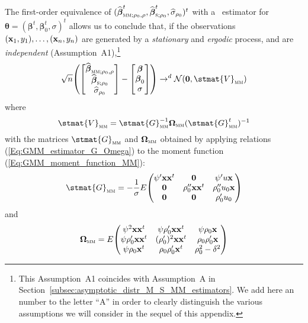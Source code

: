 The first-order equivalence of
$(\sthat{\boldsymbol\beta}_{\stsc{MM};\rho_0,\rho}^t,
\sthat{\boldsymbol\beta}_{\stsc{S};\rho_0}^t, \sthat{\sigma}_{\rho_0})^t$ with
a ~estimator for $\boldsymbol\theta = (\boldsymbol\beta^t,
\boldsymbol\beta_0^t, \sigma)^t$ allows us to conclude that, if the
observations $(\mathbf x_1, y_1), \dots, (\mathbf x_n, y_n)$ are generated by a
\emph{stationary} and \emph{ergodic} process, and are \emph{independent}
(Assumption~A1),\footnote{This Assumption~A1 coincides with Assumption~A in
Section~\ref{subsec:asymptotic_distr_M_S_MM_estimators}. We add here an number
to the letter “A” in order to clearly distinguish the various assumptions we
will consider in the sequel of this appendix.}
\[
    \sqrt{n}\left(
    \begin{bmatrix}
        \sthat{\boldsymbol\beta}_{\stsc{MM};\rho_0,\rho}\\
        \sthat{\boldsymbol\beta}_{\stsc{S};\rho_0}\\
        \sthat{\sigma}_{\rho_0}
    \end{bmatrix}
    -
    \begin{bmatrix}
        \boldsymbol\beta\\
        \boldsymbol\beta_0\\
        \sigma
    \end{bmatrix}
    \right)  \rightarrow^{d} \mathcal{N}(\stvec{0}, \stmat{V}_\stsc{MM})
\]
where
\[
    \stmat{V}_\stsc{MM} = \stmat{G}_\stsc{MM}^{-1} \boldsymbol\Omega_\stsc{MM}
        (\stmat{G}_\stsc{MM}^t)^{-1}
\]
with the matrices $\stmat{G}_\stsc{MM}$ and $\boldsymbol\Omega_\stsc{MM}$
obtained by applying relations (\ref{Eq:GMM_estimator_G_Omega}) to the moment
function (\ref{Eq:GMM_moment_function_MM}):
\[
    \stmat{G}_\stsc{MM} = -\frac{1}{\sigma} E
    \begin{pmatrix}
        \psi'\stvec{x}\stvec{x}^t & \stvec{0}                    & \psi'u\stvec{x}      \\
        \stvec{0}                 & \rho_0''\stvec{x}\stvec{x}^t & \rho_0''u_0\stvec{x} \\
        \stvec{0}                 & \stvec{0}                    & \rho_0'u_0  
    \end{pmatrix}
\]
and
\[
    \boldsymbol\Omega_\stsc{MM} = E
    \begin{pmatrix}
        \psi^2\stvec{x}\stvec{x}^t      & \psi\rho_0'\stvec{x}\stvec{x}^t & \psi\rho_0\stvec{x}   \\
        \psi\rho_0'\stvec{x}\stvec{x}^t & (\rho_0')^2\stvec{x}\stvec{x}^t & \rho_0\rho_0'\stvec{x}\\
        \psi\rho_0\stvec{x}^t           & \rho_0\rho_0'\stvec{x}^t        & \rho_0^2-\delta^2
    \end{pmatrix}
\]

